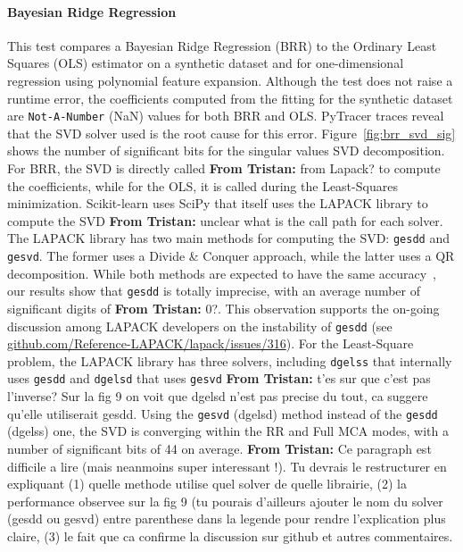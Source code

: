\documentclass[11pt]{article}
\newcommand{\tristan}[1]{\color{orange}\textbf{From Tristan:} #1\color{black}\xspace}
\newcommand{\pytracer}[0]{PyTracer\xspace}
\begin{document}

\paragraph{Bayesian Ridge Regression}

This test compares a Bayesian Ridge Regression (BRR) to the Ordinary Least Squares (OLS) estimator on a synthetic dataset and for one-dimensional regression using polynomial feature expansion. Although the test does not raise a runtime error, the coefficients computed from the fitting for the synthetic dataset are \texttt{Not-A-Number} (NaN) values for both BRR and OLS. \pytracer traces reveal that the SVD solver used is the root cause for this error. Figure~\ref{fig:brr_svd_sig} shows
the number of significant bits for the singular values SVD decomposition. 
For BRR, the SVD is directly called \tristan{from Lapack?} to compute the coefficients, while for the OLS, it is called during the Least-Squares minimization. Scikit-learn uses SciPy that itself uses the LAPACK library to compute the SVD \tristan{unclear what is the call path for each solver}.
The LAPACK library has two main methods for computing the SVD: 
\texttt{gesdd} and \texttt{gesvd}. The former uses a Divide \& Conquer approach, while the latter uses a QR decomposition. While both methods are expected to have the same accuracy~\cite{nakatsukasa2013stable}, our results show that \texttt{gesdd} is totally imprecise, with an average number of significant digits of \tristan{0?}. 
This observation supports the on-going discussion among LAPACK developers on the instability of \texttt{gesdd} (see  \href{https://github.com/Reference-LAPACK/lapack/issues/316}{github.com/Reference-LAPACK/lapack/issues/316}). For the Least-Square problem, the LAPACK library has three solvers, including \texttt{dgelss} that internally uses \texttt{gesdd} and \texttt{dgelsd} that uses \texttt{gesvd} \tristan{t'es sur que c'est pas l'inverse? Sur la fig 9 on voit que dgelsd n'est pas precise du tout, ca suggere qu'elle utiliserait gesdd}. Using the \texttt{gesvd} (dgelsd) method instead of the \texttt{gesdd} (dgelss) one, the SVD is converging within the RR and Full MCA modes, with a number of significant bits of 44 on average. \tristan{Ce paragraph est difficile a lire (mais neanmoins super interessant !). Tu devrais le restructurer en expliquant (1) quelle methode utilise quel solver de quelle librairie, (2) la performance observee sur la fig 9 (tu pourais d'ailleurs ajouter le nom du solver (gesdd ou gesvd) entre parenthese dans la legende pour rendre l'explication plus claire, (3) le fait que ca confirme la discussion sur github et autres commentaires.}
\end{document}
